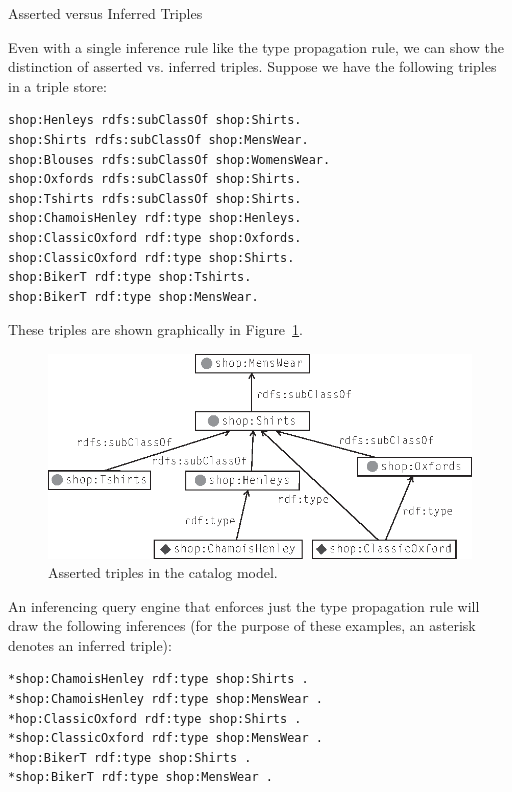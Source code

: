 \begin{example}{Asserted versus Inferred Triples}

Even with a single inference rule like the type propagation rule, we can
show the distinction of asserted vs. inferred triples. Suppose we have
the following triples in a triple store:

\begin{lstlisting}
shop:Henleys rdfs:subClassOf shop:Shirts. 
shop:Shirts rdfs:subClassOf shop:MensWear. 
shop:Blouses rdfs:subClassOf shop:WomensWear.
shop:Oxfords rdfs:subClassOf shop:Shirts. 
shop:Tshirts rdfs:subClassOf shop:Shirts. 
shop:ChamoisHenley rdf:type shop:Henleys.
shop:ClassicOxford rdf:type shop:Oxfords. 
shop:ClassicOxford rdf:type shop:Shirts. 
shop:BikerT rdf:type shop:Tshirts.
shop:BikerT rdf:type shop:MensWear.
\end{lstlisting}

These triples are shown graphically in Figure~\ref{fig:ch7.2}.

\begin{figure}
\centering
\includegraphics[width=5in]{media/ch7/f07-02.eps}
\caption{Asserted triples in the catalog model.}
\label{fig:ch7.2}
\end{figure}

An inferencing query engine that enforces just the type propagation rule
will draw the following inferences (for the purpose of these examples, an asterisk denotes an inferred triple):

\begin{lstlisting}
*shop:ChamoisHenley rdf:type shop:Shirts .
*shop:ChamoisHenley rdf:type shop:MensWear .
*hop:ClassicOxford rdf:type shop:Shirts .
*shop:ClassicOxford rdf:type shop:MensWear .
*hop:BikerT rdf:type shop:Shirts .
*shop:BikerT rdf:type shop:MensWear .
\end{lstlisting}


\end{example}
